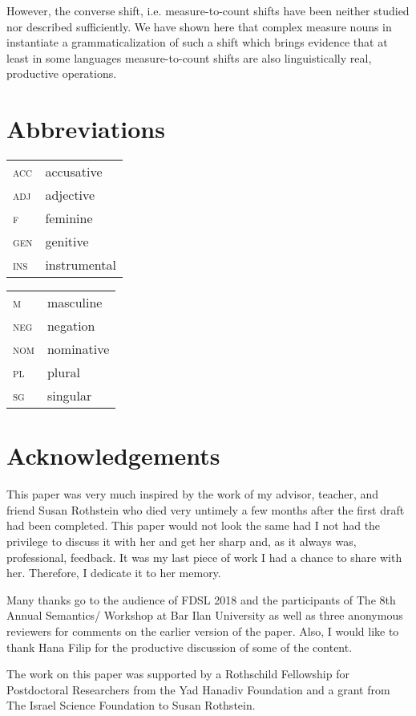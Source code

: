 \documentclass[output=paper]{langscibook}
\begin{document}
However, the converse shift, i.e. measure-to-count shifts have been neither studied nor described sufficiently. We have shown here that complex measure nouns in  instantiate a grammaticalization of such a shift which brings evidence that at least in some languages measure-to-count shifts are also linguistically real, productive operations.


\section*{Abbreviations}

\begin{tabularx}{.5\textwidth}{@{}lX}
\textsc{acc}& accusative\\
\textsc{adj}& adjective \\
\textsc{f}& feminine \\
\textsc{gen}& genitive \\
\textsc{ins}& instrumental \\
\end{tabularx}%
\begin{tabularx}{.5\textwidth}{lX@{}}
\textsc{m}& masculine \\
\textsc{neg}& negation \\
\textsc{nom}& nominative \\
\textsc{pl}& plural \\
\textsc{sg}& singular \\
\end{tabularx}

\section*{Acknowledgements}
This paper was very much inspired by the work of my advisor, teacher, and friend Susan Rothstein who died very untimely a few months after the first draft had been completed. This paper would not look the same had I not had the privilege to discuss it with her and get her sharp and, as it always was, professional, feedback. It was my last piece of work I had a chance to share with her. Therefore, I dedicate it to her memory.

Many thanks go to the audience of FDSL 2018 and the participants of The 8th Annual Semantics/ Workshop at Bar Ilan University as well as three anonymous reviewers for comments on the earlier version of the paper. Also, I would like to thank Hana Filip for the productive discussion of some of the content.

The work on this paper was supported by a Rothschild Fellowship for Postdoctoral Researchers from the Yad Hanadiv Foundation and a grant from The Israel Science Foundation to Susan Rothstein.

{\sloppy\printbibliography[heading=subbibliography,notkeyword=this]}
\end{document}
